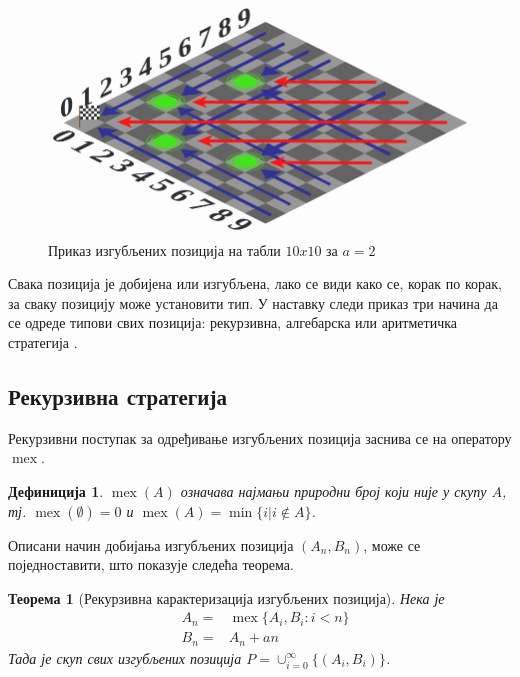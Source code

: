 \documentclass[a4paper]{article}
\newtheorem{theorem}{Теорема}
\newtheorem{definition}{Дефиниција}
\DeclareMathOperator{\mex}{mex}
\begin{document}
\begin{figure}[H]
	\caption{Приказ изгубљених позиција на табли $ 10x10 $ за $ a = 2 $}
	\label{fig:sahovska_tabla_pozicije_a_2}
	\begin{center}
		\includegraphics[width=\textwidth]{10x10.png}
	\end{center}
\end{figure}

Свака позиција је добијена или изгубљена, лако се види како се, корак по корак, за сваку позицију може установити тип. У наставку следи приказ три начина да се одреде типови свих позиција: рекурзивна, алгебарска или аритметичка стратегија \cite{10.2307/2321643}.

\subsection{Рекурзивна стратегија}

Рекурзивни поступак за одређивање изгубљених позиција заснива се на оператору $ \mex $.

\begin{definition}
	\label{def:mex}
	$\mex(A)$ означава најмањи природни број који није у скупу $ A $, тј. $ \mex(\emptyset)=0 $ и
$ \mex(A)=\min\{i | i\notin A\} $.
\end{definition}

Описани начин добијања изгубљених позиција $ (A_{n}, B_{n}) $, може се поједноставити, што показује следећа теорема. 

\begin{theorem} [Рекурзивна карактеризација изгубљених позиција]
	\label{thm:reukrzivna_strategija}
	Нека је 
	\begin{eqnarray}
		&A_{n} = &\mex \{ A_{i}, B_{i} : i < n \}\\
		&B_{n} = &A_{n} + an
	\end{eqnarray}
	Тада је скуп свих изгубљених позиција
	$ P = \cup_{i=0}^{\infty} \{(A_{i},B_{i})\} $.
\end{theorem}
\end{document}
